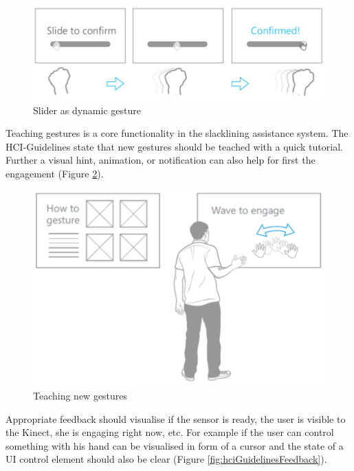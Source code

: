 \begin{figure}[htb]
	\centering
	\begin{minipage}[t]{1\linewidth}
		\centering
		\includegraphics[width=0.5\linewidth]{Pictures/hciGuidelinesDynamicGesture}
		\caption{Slider as dynamic gesture \cite{MicrosoftHIG2014-mh}}
		\label{fig:hciGuidelinesDynamicGesture}
	\end{minipage}
\end{figure}

Teaching gestures is a core functionality in the slacklining assistance system. The HCI-Guidelines state that new gestures should be teached with a quick tutorial. Further a visual hint, animation, or notification can also help for first the engagement (Figure \ref{fig:hciGuidelinesTeachingMethods}).

\begin{figure}[htb]
	\centering
	\begin{minipage}[t]{1\linewidth}
		\centering
		\includegraphics[width=0.4\linewidth]{Pictures/hciGuidelinesTeachingMethods}
		\caption{Teaching new gestures \cite{MicrosoftHIG2014-mh}}
		\label{fig:hciGuidelinesTeachingMethods}
	\end{minipage}
\end{figure}

Appropriate feedback should visualise if the sensor is ready, the user is visible to the Kinect, she is engaging right now, etc. For example if the user can control something with his hand can be visualised in form of a cursor and the state of a UI control element should also be clear (Figure \ref{fig:hciGuidelinesFeedback}).

